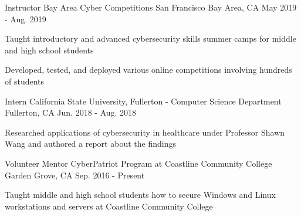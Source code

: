 

\begin{cventries}

  \cventry
    {Instructor} %
    {Bay Area Cyber Competitions} %
    {San Francisco Bay Area, CA} %
    {May 2019 - Aug. 2019} %
    {
      \begin{cvitems} %
        \item {Taught introductory and advanced cybersecurity skills summer camps for middle and high school students}
        \item {Developed, tested, and deployed various online competitions involving hundreds of students}
      \end{cvitems}
    }

  \cventry
    {Intern} %
    {California State University, Fullerton - Computer Science Department} %
    {Fullerton, CA} %
    {Jun. 2018 - Aug. 2018} %
    {
      \begin{cvitems} %
        \item {Researched applications of cybersecurity in healthcare under Professor Shawn Wang and authored a report about the findings}
      \end{cvitems}
    }
    
  \cventry
    {Volunteer Mentor} %
    {CyberPatriot Program at Coastline Community College} %
    {Garden Grove, CA} %
    {Sep. 2016 - Present} %
    {
      \begin{cvitems} %
        \item {Taught middle and high school students how to secure Windows and Linux workstations and servers at Coastline Community College}
      \end{cvitems}
    }

\end{cventries}
